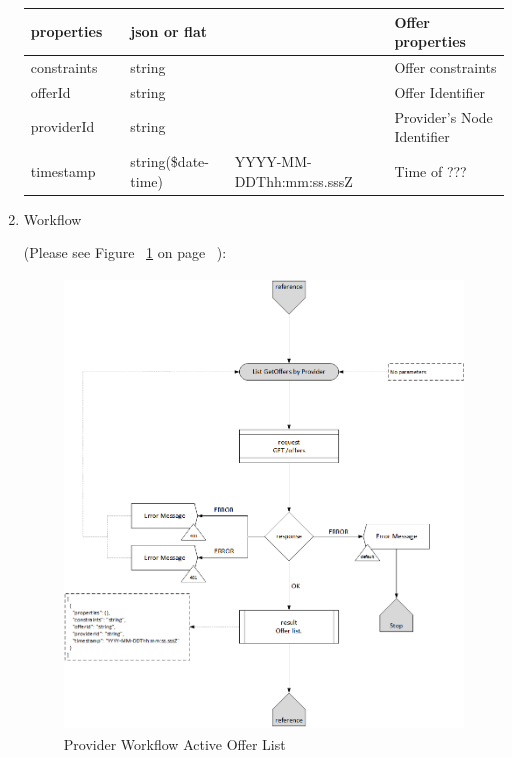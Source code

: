 \begin{enumerate}
\begin{table}[H]
\begin{center}
\begin{tabular}{|p{3cm}|l|p{3cm}|p{3cm}|p{4cm}|}
properties	& 	& 	json or flat	&		&	Offer properties \\ 

\hline

constraints	& 	& 	string	&		&	Offer constraints \\ 

\hline

offerId		&	&	string	&		& 	Offer Identifier \\

\hline

providerId  & 	&	string	&		&	Provider's Node Identifier \\

\hline

timestamp	&	& 	string(\$date-time)	& YYYY-MM-DDThh:mm:ss.sssZ	&	Time of ???  \\ 

\hline

\end{tabular}
\end{center}

\end{table}

\item Workflow

(Please see Figure ~\ref{fig:LO} on page ~\pageref{fig:LO}):

\begin{figure}[H]
    \centering
    \includegraphics[width=12cm,height=12cm,angle=0]{./diag/Workflow/Market/List(GetOffers)-P-Workflow.png}
    \caption{Provider Workflow Active Offer List }
	\label{fig:LO}
\end{figure}


\end{enumerate}


